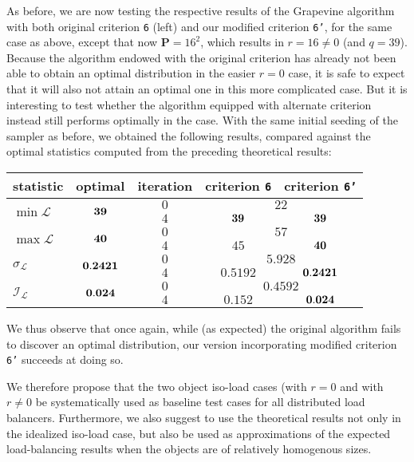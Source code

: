 As before, we are now testing the respective results of the
Grapevine algorithm with both original criterion \texttt{6} (left) and
our modified criterion \texttt{6'}, for the same case as above, except
that now $\mathbf{P}=16^2$, which results in $r=16\neq0$ (and $q=39$).
Because the algorithm endowed with the original criterion has already
not been able to obtain an optimal distribution in the easier $r=0$
case, it is safe to expect that it will also not attain an optimal one
in this more complicated case. But it is interesting to test whether
the algorithm equipped with alternate criterion instead still performs
optimally in the case.
With the same initial seeding of the sampler as before, we obtained
the following results, compared against the optimal statistics
computed from the preceding theoretical results:
\begin{center}
\begin{tabular}{lcccc}
\hline
statistic & \textbf{optimal} & iteration
& criterion \texttt{6} & criterion \texttt{6'} \\
\hline\hline
\multirow{2}{*}{$\min{\mathcal{L}}$}
&\multirow{2}{*}{$\bf39$}
&$0$ &\multicolumn{2}{c}{$22$} \\
&&$4$ &$\bf39$    &$\bf39$ \\\hline
\multirow{2}{*}{$\max{\mathcal{L}}$}
&\multirow{2}{*}{$\bf40$}
&$0$ &\multicolumn{2}{c}{$57$} \\
&&$4$ &$45$   &$\bf40$ \\\hline
\multirow{2}{*}{$\sigma_{\mathcal{L}}$}
&\multirow{2}{*}{$\bf0.2421$}
&$0$ &\multicolumn{2}{c}{$5.928$} \\
&&$4$ &$0.5192$  &$\bf0.2421$ \\\hline
\multirow{2}{*}{$\mathcal{I}_\mathcal{L}$}
&\multirow{2}{*}{$\bf0.024$}
&$0$ &\multicolumn{2}{c}{$0.4592$} \\
&&$4$ &$0.152$  &$\bf0.024$ \\\hline
\end{tabular}
\end{center}
We thus observe that once again, while (as expected) the original
algorithm fails to discover an optimal distribution, our version
incorporating modified criterion \texttt{6'} succeeds at doing so.

We therefore propose that the two object iso-load cases (with $r=0$
and with $r\neq0$ be systematically used as baseline test cases for
all distributed load balancers.
Furthermore, we also suggest to use the theoretical results not only
in the idealized iso-load case, but also be used as approximations of
the expected load-balancing results when the objects are of relatively
homogenous sizes.

